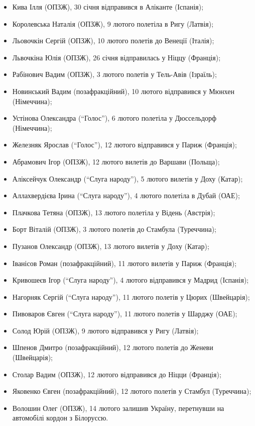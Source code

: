 \begin{itemize}
\begin{itemize}
  \item Кива Ілля (ОПЗЖ), 30 січня відправився в Аліканте (Іспанія);
  \item Королевська Наталія (ОПЗЖ), 9 лютого полетіла в Ригу (Латвія);
  \item Льовочкін Сергій (ОПЗЖ), 10 лютого полетів до Венеції (Італія);
  \item Львочкіна Юлія (ОПЗЖ), 26 січня відправилась у Ніццу (Франція);
  \item Рабінович Вадим (ОПЗЖ), 3 лютого полетів у Тель-Авів (Ізраїль);
  \item Новинський Вадим (позафракційний), 10 лютого відправився у Мюнхен (Німеччина);
  \item Устінова Олександра (\enquote{Голос}), 6 лютого полетіла у Дюссельдорф (Німеччина);
  \item Железняк Ярослав (\enquote{Голос}), 12 лютого відправився у Париж (Франція);
  \item Абрамович Ігор (ОПЗЖ), 12 лютого вилетів до Варшави (Польща);
  \item Аліксейчук Олександр (\enquote{Слуга народу}), 5 лютого вилетів у Доху (Катар);
  \item Аллахвердієва Ірина (\enquote{Слуга народу}), 4 лютого полетіла в Дубай (ОАЕ);
  \item Плачкова Тетяна (ОПЗЖ), 13 лютого полетіла у Відень (Австрія);
  \item Борт Віталій (ОПЗЖ), 3 лютого полетів до Стамбула (Туреччина);
  \item Пузанов Олександр (ОПЗЖ), 13 лютого вилетів у Доху (Катар);
  \item Іванісов Роман (позафракційний), 11 лютого вилетів у Париж (Франція);
  \item Кривошеєв Ігор (\enquote{Слуга народу}), 4 лютого відправився у Мадрид (Іспанія);
  \item Нагорняк Сергій (\enquote{Слуга народу}), 11 лютого полетів у Цюрих (Швейцарія);
  \item Пивоваров Євген (\enquote{Слуга народу}), 11 лютого полетів у Шарджу (ОАЕ);
  \item Солод Юрій (ОПЗЖ), 9 лютого відправився у Ригу (Латвія);
  \item Шпенов Дмитро (позафракційний), 12 лютого полетів до Женеви (Швейцарія);
  \item Столар Вадим (ОПЗЖ), 12 лютого відправився до Ніцци (Франція);
  \item Яковенко Євген (позафракційний), 12 лютого полетів у Стамбул (Туреччина);
  \item Волошин Олег (ОПЗЖ), 14 лютого залишив Україну, перетнувши на автомобілі кордон з Білоруссю.
\end{itemize}


\end{itemize}
